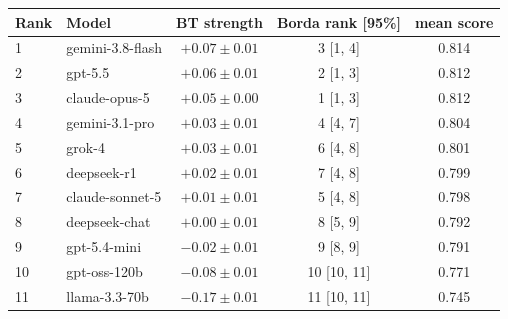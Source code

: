 \begin{tabular}{llccc}
\toprule
Rank & Model & BT strength & Borda rank [95\%] & mean score \\
\midrule
1 & gemini-3.8-flash & $+0.07 \pm 0.01$ & 3 [1, 4] & 0.814 \\
2 & gpt-5.5 & $+0.06 \pm 0.01$ & 2 [1, 3] & 0.812 \\
3 & claude-opus-5 & $+0.05 \pm 0.00$ & 1 [1, 3] & 0.812 \\
4 & gemini-3.1-pro & $+0.03 \pm 0.01$ & 4 [4, 7] & 0.804 \\
5 & grok-4 & $+0.03 \pm 0.01$ & 6 [4, 8] & 0.801 \\
6 & deepseek-r1 & $+0.02 \pm 0.01$ & 7 [4, 8] & 0.799 \\
7 & claude-sonnet-5 & $+0.01 \pm 0.01$ & 5 [4, 8] & 0.798 \\
8 & deepseek-chat & $+0.00 \pm 0.01$ & 8 [5, 9] & 0.792 \\
9 & gpt-5.4-mini & $-0.02 \pm 0.01$ & 9 [8, 9] & 0.791 \\
10 & gpt-oss-120b & $-0.08 \pm 0.01$ & 10 [10, 11] & 0.771 \\
11 & llama-3.3-70b & $-0.17 \pm 0.01$ & 11 [10, 11] & 0.745 \\
\bottomrule
\end{tabular}

